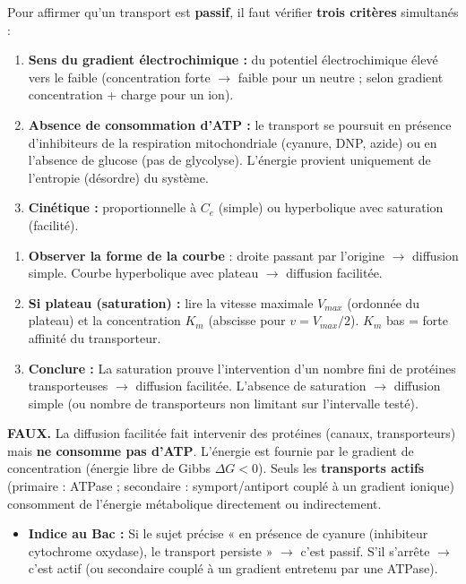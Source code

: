 \documentclass[11pt]{article}
\newcommand{\cle}[1]{{\popxbold\color{popdark}#1}}
\begin{document}
\begin{aretenir}
Pour affirmer qu'un transport est \textbf{passif}, il faut vérifier \textbf{trois critères} simultanés :
\begin{enumerate}
    \item \textbf{Sens du gradient électrochimique :} du potentiel électrochimique élevé vers le faible (concentration forte $\rightarrow$ faible pour un neutre ; selon gradient concentration + charge pour un ion).
    \item \textbf{Absence de consommation d'ATP :} le transport se poursuit en présence d'inhibiteurs de la respiration mitochondriale (cyanure, DNP, azide) ou en l'absence de glucose (pas de glycolyse). L'énergie provient uniquement de l'entropie (désordre) du système.
    \item \textbf{Cinétique :} proportionnelle à $C_e$ (simple) ou hyperbolique avec saturation (facilité).
\end{enumerate}
\end{aretenir}

\begin{methode}[Exploiter un graphe $v = f(C_e)$ pour identifier le mode de transport]
\begin{enumerate}
    \item \textbf{Observer la forme de la courbe} : droite passant par l'origine $\rightarrow$ \cle{diffusion simple}. Courbe hyperbolique avec plateau $\rightarrow$ \cle{diffusion facilitée}.
    \item \textbf{Si plateau (saturation) :} lire la vitesse maximale $V_{max}$ (ordonnée du plateau) et la concentration $K_m$ (abscisse pour $v = V_{max}/2$). $K_m$ bas = forte affinité du transporteur.
    \item \textbf{Conclure :} La saturation prouve l'intervention d'un nombre fini de protéines transporteuses $\rightarrow$ diffusion facilitée. L'absence de saturation $\rightarrow$ diffusion simple (ou nombre de transporteurs non limitant sur l'intervalle testé).
\end{enumerate}
\end{methode}

\begin{attention}[Piège classique : « Protéine = Actif »]
\textbf{FAUX.} La \cle{diffusion facilitée} fait intervenir des protéines (canaux, transporteurs) mais \textbf{ne consomme pas d'ATP}. L'énergie est fournie par le gradient de concentration (énergie libre de Gibbs $\Delta G < 0$). Seuls les \textbf{transports actifs} (primaire : ATPase ; secondaire : symport/antiport couplé à un gradient ionique) consomment de l'énergie métabolique directement ou indirectement.
\begin{itemize}
    \item \textbf{Indice au Bac :} Si le sujet précise « en présence de cyanure (inhibiteur cytochrome oxydase), le transport persiste » $\rightarrow$ c'est passif. S'il s'arrête $\rightarrow$ c'est actif (ou secondaire couplé à un gradient entretenu par une ATPase).
\end{itemize}
\end{attention}
\end{document}

